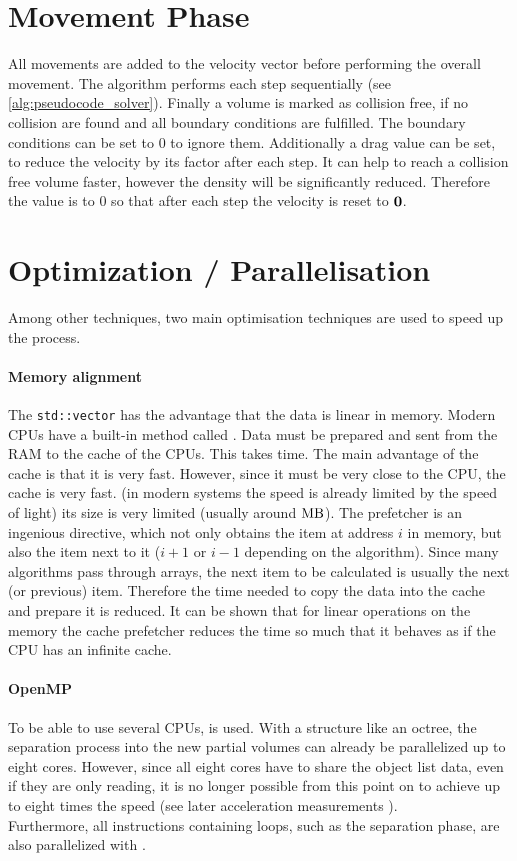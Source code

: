 \section{Movement Phase}
All movements are added to the velocity vector before performing the overall movement.
The algorithm performs each step sequentially (see \cref{alg:pseudocode_solver}).
% 
Finally a volume is marked as collision free, if no collision are found and all boundary conditions are fulfilled. 
The boundary conditions can be set to 0 to ignore them.
Additionally a drag value can be set, to reduce the velocity by its factor after each step.
It can help to reach a collision free volume faster, however the density will be significantly reduced.
Therefore the value is to 0 so that after each step the velocity is reset to $\mathbf{0}$. 
% 
\section{Optimization / Parallelisation}
% 
Among other techniques, two main optimisation techniques are used to speed up the process.
% 
\paragraph{Memory alignment}
The \texttt{std::vector} has the advantage that the data is linear in memory.
Modern \ac{CPU}s have a built-in method called .
Data must be prepared and sent from the \ac{RAM} to the cache of the \ac{CPU}s.
This takes time.
The main advantage of the cache is that it is very fast.
However, since it must be very close to the \ac{CPU}, the cache is very fast. (in modern systems the speed is already limited by the speed of light) its size is very limited (usually around $\si{\mega\byte}$).
The prefetcher is an ingenious directive, which not only obtains the item at address $i$ in memory, but also the item next to it ($i+1$ or $i-1$ depending on the algorithm).
Since many algorithms pass through arrays, the next item to be calculated is usually the next (or previous) item.
Therefore the time needed to copy the data into the cache and prepare it is reduced.
It can be shown that for linear operations on the memory the cache prefetcher reduces the time so much that it behaves as if the \ac{CPU} has an infinite cache.
% 
\paragraph{OpenMP}
% 
To be able to use several \ac{CPU}s, \openmp is used. With a structure like an octree, the separation process into the new partial volumes can already be parallelized up to eight cores.
However, since all eight cores have to share the object list data, even if they are only reading, it is no longer possible from this point on to achieve up to eight times the speed (see later acceleration measurements \dummy).
\\
% 
Furthermore, all instructions containing loops, such as the separation phase, are also parallelized with \openmp.
% 
% 
% 
